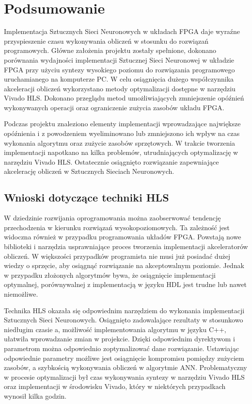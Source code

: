 \newpage %
\cleardoublepage %
\pagestyle{headings}

\section{Podsumowanie}

Implementacja Sztucznych Sieci Neuronowych w układach FPGA daje wyraźne przyspieszenie czasu wykonywania obliczeń w stosunku do rozwiązań programowych. Główne założenia projektu zostały spełnione, dokonano porównania wydajności implementacji Sztucznej Sieci Neuronowej w układzie FPGA przy użyciu syntezy wysokiego poziomu do rozwiązania programowego uruchamianego na komputerze PC. W celu osiągnięcia dużego współczynnika akceleracji obliczeń wykorzystano metody optymalizacji dostępne w narzędziu Vivado HLS. Dokonano przeglądu metod umożliwiających zmniejszenie opóźnień wykonywanych operacji oraz ograniczenie zużycia zasobów układu FPGA.

Podczas projektu znaleziono elementy implementacji wprowadzające największe opóźnienia i z powodzeniem wyeliminowano lub zmniejszono ich wpływ na czas wykonania algorytmu oraz zużycie zasobów sprzętowych. W trakcie tworzenia implementacji napotkano na kilka problemów, utrudniających optymalizację w narzędziu Vivado HLS. Ostatecznie osiągnięto rozwiązanie zapewniające akcelerację obliczeń w Sztucznych Sieciach Neuronowych. 


\subsection{Wnioski dotyczące techniki HLS}
W dziedzinie rozwijania oprogramowania można zaobserwować tendencję przechodzenia w kierunku rozwiązań wysokopoziomowych. Ta zależność jest widoczna również w przypadku programowania układów FPGA. Powstają nowe biblioteki i narzędzia usprawniające proces tworzenia implementacji akceleratorów obliczeń. W większości przypadków programista nie musi już posiadać dużej wiedzy o sprzęcie, aby osiągnąć rozwiązanie na akceptowalnym poziomie. Jednak w przypadku złożonych algorytmów bywa, że osiągnięcie implementacji optymalnej, porównywalnej z implementacją w języku HDL jest trudne lub nawet niemożliwe.

Technika HLS okazała się odpowiednim narzędziem do wykonania implementacji Sztucznych Sieci Neuronowych. Osiągnięto zadowalające rezultaty w stosunkowo niedługim czasie a, możliwość implementowania algorytmu w języku C++, ułatwiła wprowadzanie zmian w projekcie. Dzięki odpowiednim dyrektywom i parametrom można odpowiednio zoptymalizować dane rozwiązanie. Ustawiając odpowiednie parametry możliwe jest osiągnięcie kompromisu pomiędzy zużyciem zasobów, a szybkością wykonywania obliczeń w algorytmie ANN. Problematyczny w procesie optymalizacji był czas wykonywania syntezy w narzędziu Vivado HLS oraz implementacji w środowisku Vivado, który w niektórych przypadkach wynosił kilka godzin. 

